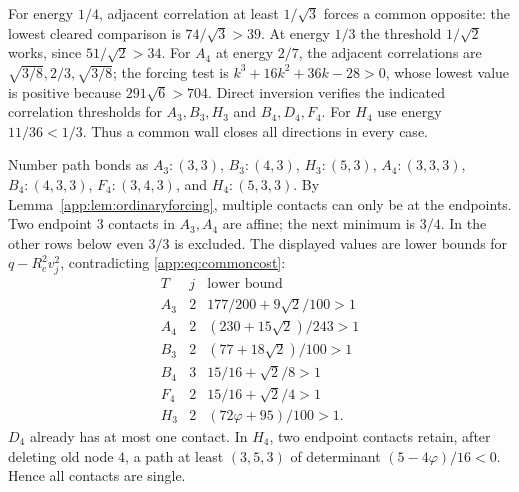 \documentclass[11pt]{article}
\theoremstyle{definition}
\theoremstyle{remark}
\newcommand{\ph}{\varphi}
\begin{document}
For energy $1/4$, adjacent correlation at least $1/\sqrt3$ forces
a common opposite: the lowest cleared comparison is
$74/\sqrt3>39$. At energy $1/3$ the threshold $1/\sqrt2$ works,
since $51/\sqrt2>34$. For $A_4$ at energy $2/7$, the adjacent
correlations are $\sqrt{3/8},2/3,\sqrt{3/8}$; the forcing test is
$k^3+16k^2+36k-28>0$, whose lowest value is positive because
$291\sqrt6>704$. Direct inversion verifies the indicated
correlation thresholds for $A_3,B_3,H_3$ and $B_4,D_4,F_4$.
For $H_4$ use energy $11/36<1/3$. Thus a common wall closes all
directions in every case.

Number path bonds as $A_3:(3,3)$, $B_3:(4,3)$, $H_3:(5,3)$,
$A_4:(3,3,3)$, $B_4:(4,3,3)$, $F_4:(3,4,3)$, and
$H_4:(5,3,3)$. By Lemma~\ref{app:lem:ordinaryforcing}, multiple
contacts can only be at the endpoints. Two endpoint $3$ contacts
in $A_3,A_4$ are affine; the next minimum is $3/4$. In the other
rows below even $3/3$ is excluded. The displayed values are lower
bounds for $q-R_e^2v_j^2$, contradicting \eqref{app:eq:commoncost}:
\[
\begin{array}{c|c|c}
T&j&\text{lower bound}\\ \hline
A_3&2&177/200+9\sqrt2/100>1\\
A_4&2&(230+15\sqrt2)/243>1\\
B_3&2&(77+18\sqrt2)/100>1\\
B_4&3&15/16+\sqrt2/8>1\\
F_4&2&15/16+\sqrt2/4>1\\
H_3&2&(72\ph+95)/100>1.
\end{array}
\]
$D_4$ already has at most one contact. In $H_4$, two endpoint
contacts retain, after deleting old node $4$, a path at least
$(3,5,3)$ of determinant $(5-4\ph)/16<0$. Hence all contacts
are single.
\end{document}
